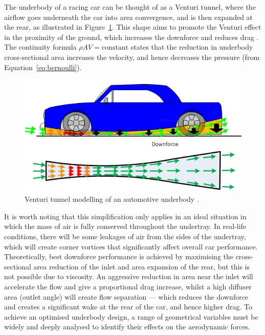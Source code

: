 \noindent The underbody of a racing car can be thought of as a Venturi tunnel, where the airflow goes underneath the car into area convergence, and is then expanded at the rear, as illustrated in Figure~\ref{fig:venturi_tunnel_car}. This shape aims to promote the Venturi effect in the proximity of the ground, which increases the downforce and reduces drag \cite{Katz2005AerodynamicsCars}. The continuity formula $\rho AV = \text{constant}$ states that the reduction in underbody cross-sectional area increases the velocity, and hence decreases the pressure (from Equation~\ref{eq:bernoulli}).

\begin{figure}[!ht]
    \centering
    \includegraphics[scale=0.8]{Figures/venturi_tunnel.jpg}
    \caption{Venturi tunnel modelling of an automotive underbody \cite{Anonymous2020RaceDesign}.}
    \label{fig:venturi_tunnel_car}
\end{figure}

\noindent It is worth noting that this simplification only applies in an ideal situation in which the mass of air is fully conserved throughout the undertray. In real-life conditions, there will be some leakages of air from the sides of the undertray, which will create corner vortices that significantly affect overall car performance. Theoretically, best downforce performance is achieved by maximising the cross-sectional area reduction of the inlet and area expansion of the rear, but this is not possible due to viscosity. An aggressive reduction in area near the inlet will accelerate the flow and give a proportional drag increase, whilst a high diffuser area (outlet angle) will create flow separation --- which reduces the downforce and creates a significant wake at the rear of the car, and hence higher drag. To achieve an optimised underbody design, a range of geometrical variables must be widely and deeply analysed to identify their effects on the aerodynamic forces.


